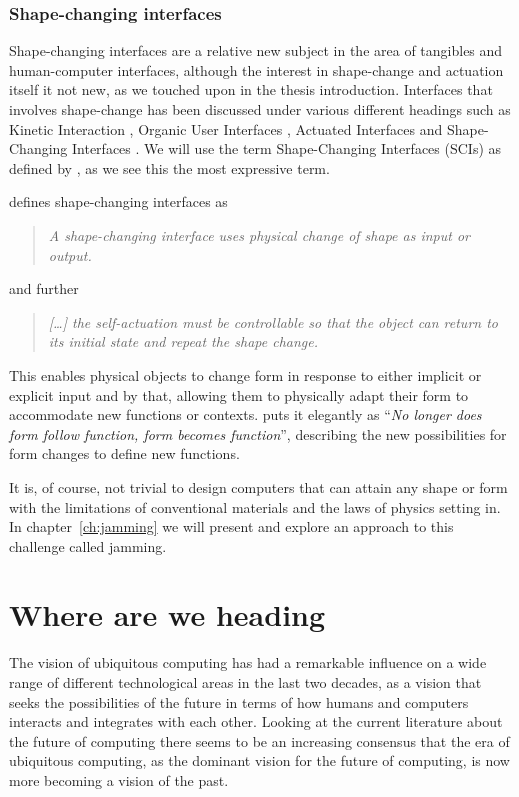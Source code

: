 \subsubsection{Shape-changing interfaces}
Shape-changing interfaces are a relative new subject in the area of tangibles and human-computer interfaces, although the interest in shape-change and actuation itself it not new, as we touched upon in the thesis introduction.
Interfaces that involves shape-change has been discussed under various different headings such as Kinetic Interaction \citep{parkes2008designing}, Organic User Interfaces \citep{parkes2008designing,holman2008organic}, Actuated Interfaces \citep{poupyrev2007actuation} and Shape-Changing Interfaces \citep{coelho2011shape,rasmussen2012shape}.
We will use the term Shape-Changing Interfaces (SCIs) as defined by \citeauthor{rasmussen2012shape}, as we see this the most expressive term.

\citeauthor{rasmussen2012shape} defines shape-changing interfaces as
\begin{quotation}
  \emph{A shape-changing interface uses physical change of shape as input or output.}
\end{quotation}
and further
\begin{quotation}
  \emph{[\ldots] the self-actuation must be controllable so that the object can return to its initial state and repeat the shape change. }  
\end{quotation}

This enables physical objects to change form in response to either implicit or explicit input and by that, allowing them to physically adapt their form to accommodate new functions or contexts.
\citep{parkes2008designing} puts it elegantly as ``\emph{No longer does form follow function, form becomes function}'', describing the new possibilities for form changes to define new functions.

It is, of course, not trivial to design computers that can attain any shape or form with the limitations of conventional materials and the laws of physics setting in.
In chapter~\ref{ch:jamming} we will present and explore an approach to this challenge called jamming.

\section{Where are we heading}
The vision of ubiquitous computing has had a remarkable influence on a wide range of different technological areas in the last two decades, as a vision that seeks the possibilities of the future in terms of how humans and computers interacts and integrates with each other. 
Looking at the current literature about the future of computing there seems to be an increasing consensus that the era of ubiquitous computing, as the dominant vision for the future of computing, is now more becoming a vision of the past.

